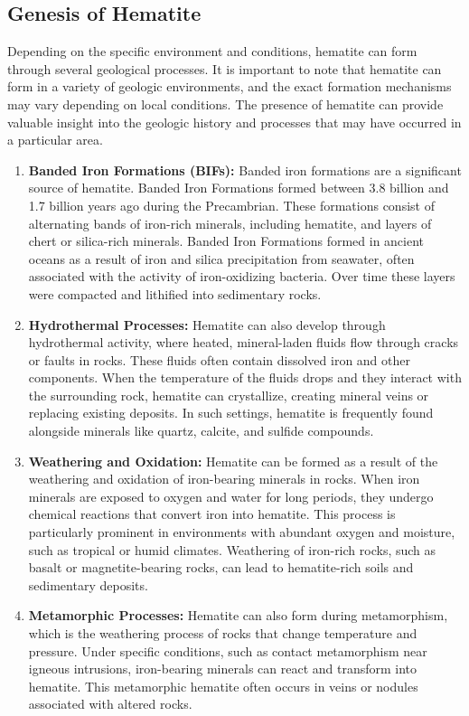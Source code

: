 \documentclass[12pt,a4paper, top=1.9cm, bottom=2.03cm, left=3.81cm, right=1.9cm]{article}
\begin{document}
\subsection{Genesis of Hematite}
\onehalfspacing
\noindent\fontsize{12}{14}\selectfont Depending on the specific environment and conditions, hematite can form through several geological processes. It is important to note that hematite can form in a variety of geologic environments, and the exact formation mechanisms may vary depending on local conditions. The presence of hematite can provide valuable insight into the geologic history and processes that may have occurred in a particular area.
\begin{enumerate}[label=\arabic*.]  %
    \item \textbf{Banded Iron Formations (BIFs):} Banded iron formations are a significant source of hematite. Banded Iron Formations formed between 3.8 billion and 1.7 billion years ago during the Precambrian. These formations consist of alternating bands of iron-rich minerals, including hematite, and layers of chert or silica-rich minerals. Banded Iron Formations formed in ancient oceans as a result of iron and silica precipitation from seawater, often associated with the activity of iron-oxidizing bacteria. Over time these layers were compacted and lithified into sedimentary rocks.
    \item \textbf{Hydrothermal Processes:} Hematite can also develop through hydrothermal activity, where heated, mineral-laden fluids flow through cracks or faults in rocks. These fluids often contain dissolved iron and other components. When the temperature of the fluids drops and they interact with the surrounding rock, hematite can crystallize, creating mineral veins or replacing existing deposits. In such settings, hematite is frequently found alongside minerals like quartz, calcite, and sulfide compounds.
    \item \textbf{Weathering and Oxidation:} Hematite can be formed as a result of the weathering and oxidation of iron-bearing minerals in rocks. When iron minerals are exposed to oxygen and water for long periods, they undergo chemical reactions that convert iron into hematite. This process is particularly prominent in environments with abundant oxygen and moisture, such as tropical or humid climates. Weathering of iron-rich rocks, such as basalt or magnetite-bearing rocks, can lead to hematite-rich soils and sedimentary deposits.
    \item \textbf{Metamorphic Processes:} Hematite can also form during metamorphism, which is the weathering process of rocks that change temperature and pressure. Under specific conditions, such as contact metamorphism near igneous intrusions, iron-bearing minerals can react and transform into hematite. This metamorphic hematite often occurs in veins or nodules associated with altered rocks.
\end{enumerate}
\end{document}
